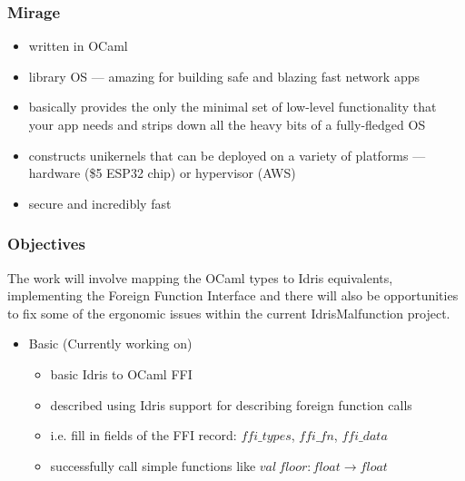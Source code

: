 \documentclass{beamer}
\begin{document}
\begin{frame}
	\frametitle{Mirage}

	\begin{itemize}
		\item written in OCaml
		\item library OS --- amazing for building safe and
		      blazing fast network apps
		\item basically provides the only the minimal set of low-level
		      functionality that your app needs and strips down all the
		      heavy bits of a fully-fledged OS
		\item constructs unikernels that can be deployed on
		      a variety of platforms --- hardware (\$5 ESP32 chip)
		      or hypervisor (AWS)
		\item secure and incredibly fast
	\end{itemize}
\end{frame}


\begin{frame}
	\frametitle{Objectives}

	The work will involve mapping the OCaml types to Idris equivalents,
	implementing the Foreign Function Interface and there will also be
	opportunities to fix some of the ergonomic issues within the
	current IdrisMalfunction project.

	\begin{itemize}
		\item Basic	(Currently working on)
		      \begin{itemize}
			      \item basic Idris to OCaml FFI
			      \item described using Idris support for describing
			            foreign function calls
			      \item i.e. fill in fields of the FFI record:
			            $ffi\_types$, $ffi\_fn$, $ffi\_data$
			      \item successfully call simple functions like
			            $val \ floor : float \rightarrow float$
		      \end{itemize}
	\end{itemize}
\end{frame}
\end{document}
